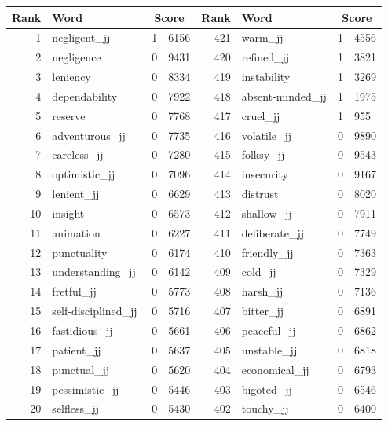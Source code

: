 \begin{table}[tbp]
    \begin{tabular}{| rlr@{.}l | rlr@{.}l |}
    \hline
    \textbf{Rank} & \textbf{Word} & \multicolumn{2}{c|}{\textbf{Score}} & \textbf{Rank} & \textbf{Word} & \multicolumn{2}{c|}{\textbf{Score}} \\
    \hline
    1 & negligent\_jj & -1 & 6156    &    421 & warm\_jj & 1 & 4556 \\
    2 & negligence & 0 & 9431    &    420 & refined\_jj & 1 & 3821 \\
    3 & leniency & 0 & 8334    &    419 & instability & 1 & 3269 \\
    4 & dependability & 0 & 7922    &    418 & absent-minded\_jj & 1 & 1975 \\
    5 & reserve & 0 & 7768    &    417 & cruel\_jj & 1 & 955 \\
    6 & adventurous\_jj & 0 & 7735    &    416 & volatile\_jj & 0 & 9890 \\
    7 & careless\_jj & 0 & 7280    &    415 & folksy\_jj & 0 & 9543 \\
    8 & optimistic\_jj & 0 & 7096    &    414 & insecurity & 0 & 9167 \\
    9 & lenient\_jj & 0 & 6629    &    413 & distrust & 0 & 8020 \\
    10 & insight & 0 & 6573    &    412 & shallow\_jj & 0 & 7911 \\
    11 & animation & 0 & 6227    &    411 & deliberate\_jj & 0 & 7749 \\
    12 & punctuality & 0 & 6174    &    410 & friendly\_jj & 0 & 7363 \\
    13 & understanding\_jj & 0 & 6142    &    409 & cold\_jj & 0 & 7329 \\
    14 & fretful\_jj & 0 & 5773    &    408 & harsh\_jj & 0 & 7136 \\
    15 & self-disciplined\_jj & 0 & 5716    &    407 & bitter\_jj & 0 & 6891 \\
    16 & fastidious\_jj & 0 & 5661    &    406 & peaceful\_jj & 0 & 6862 \\
    17 & patient\_jj & 0 & 5637    &    405 & unstable\_jj & 0 & 6818 \\
    18 & punctual\_jj & 0 & 5620    &    404 & economical\_jj & 0 & 6793 \\
    19 & pessimistic\_jj & 0 & 5446    &    403 & bigoted\_jj & 0 & 6546 \\
    20 & selfless\_jj & 0 & 5430    &    402 & touchy\_jj & 0 & 6400 \\

\end{tabular}
\end{table}
